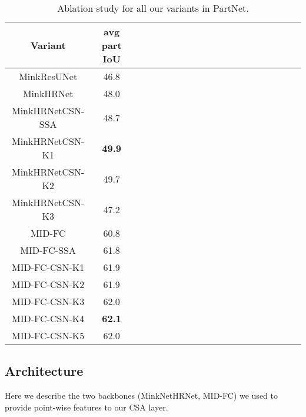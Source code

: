 \documentclass{egpubl}
\begin{document}
\begin{table}[!t]
    \begin{center}
    \begin{adjustbox}{max width=\textwidth}
        \begin{tabular}{*{20}{c}}
        \toprule
        Variant & \textbf{avg part IoU} \\
        \midrule
 MinkResUNet       & 46.8 \\ 
 MinkHRNet         & 48.0 \\
 MinkHRNetCSN-SSA  & 48.7 \\ 
 MinkHRNetCSN-K1   & \textbf{49.9} \\
 MinkHRNetCSN-K2   & 49.7 \\
 MinkHRNetCSN-K3   & 47.2 \\ 
\midrule
\midrule
 MID-FC            & 60.8  \\ 
 MID-FC-SSA        & 61.8  \\
 MID-FC-CSN-K1     & 61.9  \\ 
 MID-FC-CSN-K2     & 61.9  \\ 
 MID-FC-CSN-K3     & 62.0  \\ 
 MID-FC-CSN-K4     & \textbf{62.1}  \\ 
 MID-FC-CSN-K5     & 62.0  \\          \bottomrule
        \end{tabular}
    \end{adjustbox}
    \end{center}
    \vspace{-1mm}
    \caption{Ablation study for all our variants in PartNet.}
    \label{table:ablation}
\vspace*{-7mm}     
\end{table}

\vspace*{-3mm}
\subsection{Architecture}
\label{subsec:csn_architecture}
Here we describe the 
two backbones (MinkNetHRNet, MID-FC) we used to provide point-wise features to our CSA layer.

\vspace{-1.75mm}
\end{document}
